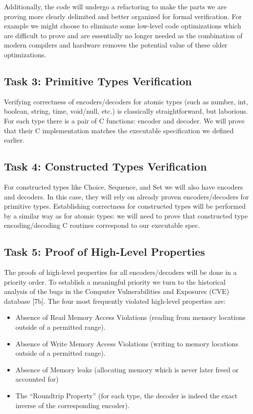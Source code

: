 \documentclass[acmsmall,nonacm]{acmart}
\begin{document}
Additionally, the code will undergo a refactoring to make the parts we are proving more clearly delimited and better organized for formal verification. For example we might choose to eliminate some low-level code optimizations which are difficult to prove and are essentially no longer needed as the combination of modern compilers and hardware removes the potential value of these older optimizations.

\subsection{Task 3: Primitive Types Verification}
Verifying correctness of encoders/decoders for atomic types (such as number, int, boolean, string, time, void/null, etc.) is classically straightforward, but laborious. For each type there is a pair of C functions: encoder and decoder. We will prove that their C implementation matches the executable specification we defined earlier.

\subsection{Task 4: Constructed Types Verification}
For constructed types like Choice, Sequence, and Set we will also have encoders and decoders. In this case, they will rely on already proven encoders/decoders for primitive types. Establishing correctness for constructed types will be performed by a similar way as for atomic types: we will need to prove that constructed type encoding/decoding C routines correspond to our executable spec. 

\subsection{Task 5: Proof of High-Level Properties} 
The proofs of high-level properties for all encoders/decoders will be done in a priority order. To establish a meaningful priority we turn to the historical analysis of the bugs in the Computer Vulnerabilities and Exposures (CVE) database [7b]. The four most frequently violated high-level properties are:
\begin{itemize}

\item Absence of Read Memory Access Violations (reading from memory locations outside of a permitted range).
\item Absence of Write Memory Access Violations (writing to memory locations outside of a permitted range).
\item Absence of Memory leaks (allocating memory which is never later freed or accounted for)
\item The ``Roundtrip Property'' (for each type, the decoder is indeed the exact inverse of the corresponding encoder).
\end{itemize}
\end{document}
